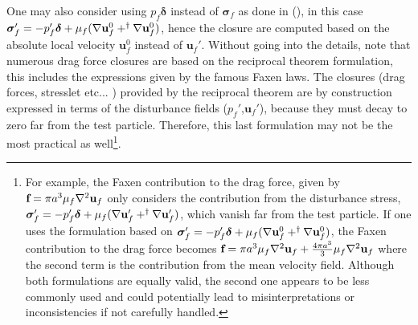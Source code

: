 One may also consider using $p_f\bm\delta$ instead of $\bm\sigma_f$  as done in \citet{morel2015mathematical} (), in this case $\bm\sigma_f'  = -p_f' \bm\delta + \mu_f (\mathbf{\nabla} \textbf{u}_f^0 + ^\dagger \mathbf{\nabla} \textbf{u}_f^0)$, hence the closure are computed based on the absolute local velocity $\textbf{u}_f^0$ instead of $\textbf{u}_f'$.
Without going into the details, note that numerous drag force closures are based on the reciprocal theorem formulation, this includes the expressions given by the famous Faxen laws.
The closures (drag forces, stresslet etc... ) provided by the reciprocal theorem are by construction expressed in terms of the disturbance fields ($p_f'$,$\textbf{u}_f'$), because they must decay to zero far from the test particle. 
Therefore, this last formulation may not be the most practical as well\footnote{
For example, the Faxen contribution to the drag force, given by $\textbf{f} = \pi a^3 \mu_f \mathbf{\nabla}^2 \textbf{u}_f$ only considers the contribution from the disturbance stress, $\bm\sigma_f'  = -p_f' \bm\delta + \mu_f (\mathbf{\nabla} \textbf{u}_f' + ^\dagger \mathbf{\nabla} \textbf{u}_f')$, which vanish far from the test particle. 
If one uses the formulation based on $\bm\sigma_f'  = -p_f' \bm\delta + \mu_f (\mathbf{\nabla} \textbf{u}_f^0 + ^\dagger \mathbf{\nabla} \textbf{u}_f^0)$, the Faxen contribution to the drag force becomes $\textbf{f} = \pi a^3 \mu_f \mathbf{\nabla}^2 \textbf{u}_f + \frac{4\pi a^3}{3}\mu_f \mathbf{\nabla}^2 \textbf{u}_f$ where the second term is the contribution from the mean velocity field.
Although both formulations are equally valid, the second one appears to be less commonly used and could potentially lead to misinterpretations or inconsistencies if not carefully handled. 
}. 



